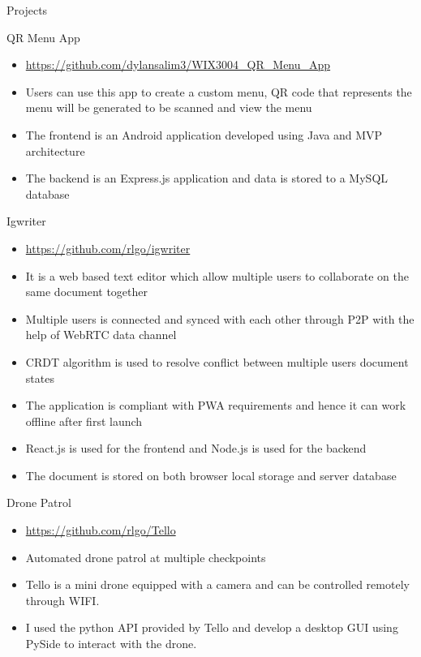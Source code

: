 \documentclass[]{mcdowellcv}
\begin{document}
\begin{cvsection}{Projects}
	\begin{cvsubsection}{QR Menu App}{}{}
		\begin{itemize}
			\item \url{https://github.com/dylansalim3/WIX3004\_QR\_Menu\_App}
			\item Users can use this app to create
			      a custom menu, QR code that represents the menu will be generated to be scanned and view the menu
			\item The frontend is an Android application developed using Java and MVP architecture
			\item The backend is an Express.js application and data is stored to a MySQL database
		\end{itemize}
	\end{cvsubsection}
	\begin{cvsubsection}{Igwriter}{}{}
		\begin{itemize}
			\item \url{https://github.com/rlgo/igwriter}
			\item It is a web based text editor which allow multiple users to collaborate on the same document together
			\item Multiple users is connected and synced with each other through P2P with the help of WebRTC data channel
			\item CRDT algorithm is used to resolve conflict between multiple users document states
			\item The application is compliant with PWA requirements and hence it can work offline after first launch
			\item React.js is used for the frontend and Node.js is used for the backend
			\item The document is stored on both browser local storage and server database
		\end{itemize}
	\end{cvsubsection}
	\begin{cvsubsection}{Drone Patrol}{}{}
		\begin{itemize}
			\item \url{https://github.com/rlgo/Tello}
			\item Automated drone patrol at multiple checkpoints
			\item Tello is a mini drone equipped with a camera and can be controlled remotely through WIFI.
			\item I used the python API provided by Tello and develop a desktop GUI using PySide to interact with the drone.

\end{itemize}
\end{cvsubsection}
\end{cvsection}
\end{document}

